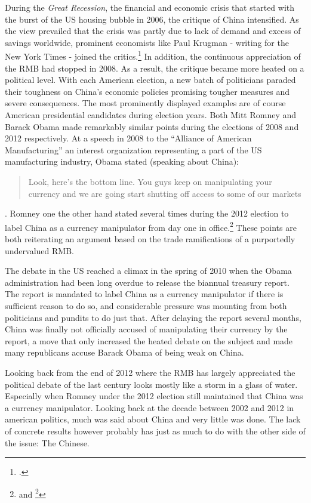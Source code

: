During the \emph{Great Recession}, the financial and economic crisis 
that started with the burst of the US housing bubble in 2006, the 
critique of China intensified. As the view prevailed that the crisis was 
partly due to lack of demand and excess of savings worldwide, prominent 
economists like Paul Krugman - writing for the New York Times - joined 
the critics.\footnote{\cite{Krugman2009}.} In addition, the continuous 
appreciation of the RMB had stopped in 2008. As a result, the critique 
became more heated on a political level. With each American election, a 
new batch of politicians paraded their toughness on China's economic 
policies promising tougher measures and severe consequences. The most 
prominently displayed examples are of course American presidential 
candidates during election years.  Both Mitt Romney and Barack Obama 
made remarkably similar points during the elections of 2008 and 2012 
respectively. At a speech in 2008 to the ``Alliance of American 
Manufacturing'' an interest organization representing a part of the US 
manufacturing industry, Obama stated (speaking about China): 
\begin{quotation}Look, here's the bottom line.  You guys keep on 
	manipulating your currency and we are going start shutting off 
	access to some of our markets
\end{quotation}.  Romney one the other hand stated several times during 
the 2012 election to label China as a currency manipulator from day one 
in office.\footnote{\cite{Obama2008} and \footnote{\cite{Romney2012}.}} 
These points are both reiterating an argument based on the trade 
ramifications of a purportedly undervalued RMB.

The debate in the US reached a climax in the spring of 2010 when the 
Obama administration had been long overdue to release the biannual 
treasury report. The report is mandated to label China as a currency 
manipulator if there is sufficient reason to do so, and considerable 
pressure was mounting from both politicians and pundits to do just that.  
After delaying the report several months, China was finally not 
officially accused of manipulating their currency by the report, a move 
that only increased the heated debate on the subject and made many 
republicans accuse Barack Obama of being weak on China.

Looking back from the end of 2012 where the RMB has largely appreciated 
the political debate of the last century looks mostly like a storm in a 
glass of water. Especially when Romney under the 2012 election still 
maintained that China was a currency manipulator. Looking back at the 
decade between 2002 and 2012 in american politics, much was said about 
China and very little was done.  The lack of concrete results however 
probably has just as much to do with the other side of the issue: The 
Chinese.


